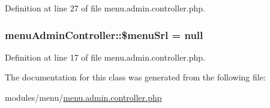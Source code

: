 Definition at line 27 of file menu.\+admin.\+controller.\+php.

\hypertarget{classmenuAdminController_a13934ce3c67b5b27f0d35704e98cc033}{}
\subsubsection[{\$menu\+Srl}]{\setlength{\rightskip}{0pt plus 5cm}menu\+Admin\+Controller\+::\$menu\+Srl = null}\label{classmenuAdminController_a13934ce3c67b5b27f0d35704e98cc033}


Definition at line 17 of file menu.\+admin.\+controller.\+php.



The documentation for this class was generated from the following file\+:\begin{DoxyCompactItemize}
\item 
modules/menu/\hyperlink{menu_8admin_8controller_8php}{menu.\+admin.\+controller.\+php}\end{DoxyCompactItemize}
